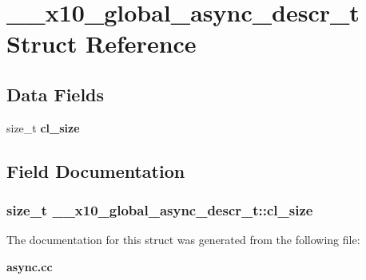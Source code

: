 \section{\_\-\_\-x10\_\-global\_\-async\_\-descr\_\-t Struct Reference}
\label{struct____x10__global__async__descr__t}
\subsection*{Data Fields}
\begin{CompactItemize}
\item 
size\_\-t {\bf cl\_\-size}
\end{CompactItemize}


\subsection{Field Documentation}
\subsubsection{\setlength{\rightskip}{0pt plus 5cm}size\_\-t {\bf \_\-\_\-x10\_\-global\_\-async\_\-descr\_\-t::cl\_\-size}}\label{struct____x10__global__async__descr__t_o0}




The documentation for this struct was generated from the following file:\begin{CompactItemize}
\item 
{\bf async.cc}\end{CompactItemize}
